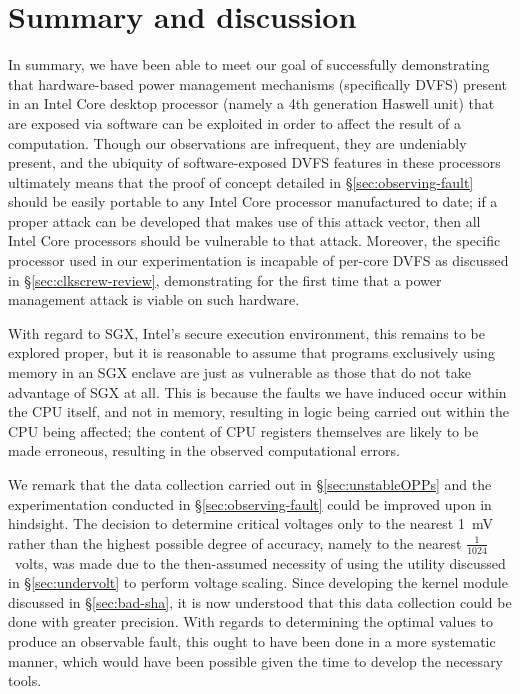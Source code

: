 \section{Summary and discussion}
\label{sec:summary}

In summary, we have been able to meet our goal of successfully demonstrating
that hardware-based power management mechanisms (specifically DVFS) present in
an Intel Core desktop processor (namely a 4th generation Haswell unit) that are
exposed via software can be exploited in order to affect the result of a
computation. Though our observations are infrequent, they are undeniably
present, and the ubiquity of software-exposed DVFS features in these processors
ultimately means that the proof of concept detailed in §\ref{sec:observing-fault}
should be easily portable to any Intel Core processor manufactured to date;
if a proper attack can be developed that makes use of this attack vector, then
all Intel Core processors should be vulnerable to that attack. Moreover, the
specific processor used in our experimentation is incapable of per-core DVFS as
discussed in §\ref{sec:clkscrew-review}, demonstrating for the first time that
a power management attack is viable on such hardware.

With regard to SGX, Intel's secure execution environment, this remains to be
explored proper, but it is reasonable to assume that programs exclusively
using memory in an SGX enclave are just as vulnerable as those that do not
take advantage of SGX at all. This is because the faults we have induced occur
within the CPU itself, and not in memory, resulting in logic being carried out
within the CPU being affected; the content of CPU registers themselves are
likely to be made erroneous, resulting in the observed computational errors.

We remark that the data collection carried out in §\ref{sec:unstableOPPs} and
the experimentation conducted in §\ref{sec:observing-fault} could be improved
upon in hindsight. The decision to determine critical voltages only to the
nearest 1~mV rather than the highest possible degree of accuracy, namely to the
nearest $\frac{1}{1024}$~volts, was made due to the then-assumed necessity of
using the  utility discussed in §\ref{sec:undervolt} to perform
voltage scaling. Since developing the kernel module discussed in §\ref{sec:bad-sha},
it is now understood that this data collection could be done with greater
precision. With regards to determining the optimal values to produce an
observable fault, this ought to have been done in a more systematic manner,
which would have been possible given the time to develop the necessary tools.
